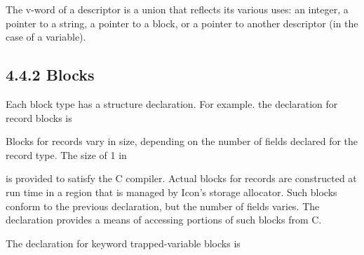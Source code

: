 The v-word of a descriptor is a union that reflects its various uses:
an integer, a pointer to a string, a pointer to a block, or a pointer
to another descriptor (in the case of a variable).

\subsection[4.4.2 Blocks]{4.4.2 Blocks}

Each block type has a structure declaration. For example. the
declaration for record blocks is


Blocks for records vary in size, depending on the number of fields
declared for the record type. The size of 1 in


\noindent is provided to satisfy the C compiler. Actual blocks for
records are constructed at run time in a region that is managed by
Icon's storage allocator. Such blocks conform to the previous
declaration, but the number of fields varies. The declaration provides
a means of accessing portions of such blocks from C.

The declaration for keyword trapped-variable blocks is


